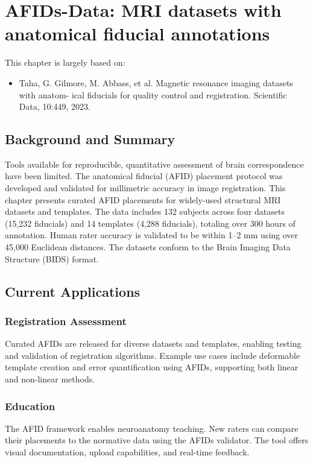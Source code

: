 \chapter{AFIDs-Data: MRI datasets with anatomical fiducial annotations}\label{chap:afidsdata}
\newpage
\sloppy

\noindent This chapter is largely based on:
\begin{itemize}[noitemsep,topsep=0pt]
	\item Taha, G. Gilmore, M. Abbass, et al. Magnetic resonance imaging datasets with anatom-
ical fiducials for quality control and registration. Scientific Data, 10:449, 2023.
\end{itemize}

\section{Background and Summary}
Tools available for reproducible, quantitative assessment of brain correspondence have been limited. The anatomical fiducial (AFID) placement protocol was developed and validated for millimetric accuracy in image registration. This chapter presents curated AFID placements for widely-used structural MRI datasets and templates. The data includes 132 subjects across four datasets (15,232 fiducials) and 14 templates (4,288 fiducials), totaling over 300 hours of annotation. Human rater accuracy is validated to be within 1--2 mm using over 45,000 Euclidean distances. The datasets conform to the Brain Imaging Data Structure (BIDS) format.

\section{Current Applications}
\subsection{Registration Assessment}
Curated AFIDs are released for diverse datasets and templates, enabling testing and validation of registration algorithms. Example use cases include deformable template creation and error quantification using AFIDs, supporting both linear and non-linear methods.

\subsection{Education}
The AFID framework enables neuroanatomy teaching. New raters can compare their placements to the normative data using the AFIDs validator. The tool offers visual documentation, upload capabilities, and real-time feedback.

